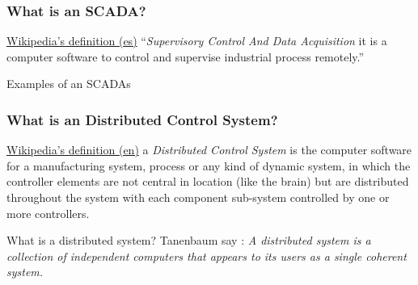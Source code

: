 \documentclass{beamer}
\begin{document}
\begin{frame}
\frametitle{What is an SCADA?}
    \begin{block}{\href{http://es.wikipedia.org/wiki/SCADA}{Wikipedia's definition (es)}}
        ``\emph{Supervisory Control And Data Acquisition} it is a computer software to control and supervise industrial process remotely.''
    \end{block}
    \begin{exampleblock}{Examples of an SCADAs}
        \begin{figure}[h]
        \end{figure}
    \end{exampleblock}
\end{frame}

\begin{frame}
\frametitle{What is an Distributed Control System?}
    \begin{block}{\href{http://en.wikipedia.org/wiki/Distributed_control_system}{Wikipedia's definition (en)}}
        a \emph{Distributed Control System} is the computer software for a manufacturing system, process or any kind of dynamic system, in which the controller elements are not central in location (like the brain) but are distributed throughout the system with each component sub-system controlled by one or more controllers.
    \end{block}
    \begin{block}{What is a distributed system?}
        Tanenbaum say \cite{TanenbaumDistr}: \emph{A distributed system is a collection of independent computers that appears to its users as a single coherent system.}
    \end{block}
\end{frame}
\end{document}
